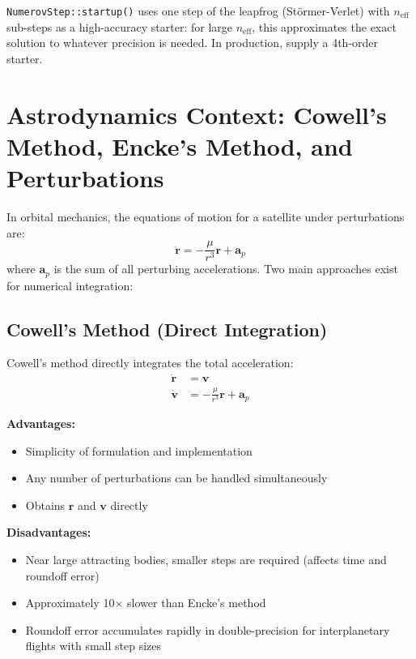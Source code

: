 \documentclass[11pt]{article}
\begin{document}
\texttt{NumerovStep::startup()} uses one step of the leapfrog (Störmer-Verlet)
with $n_\text{eff}$ sub-steps as a high-accuracy starter: for large
$n_\text{eff}$, this approximates the exact solution to whatever precision is
needed.  In production, supply a 4th-order starter.

\section{Astrodynamics Context: Cowell's Method, Encke's Method, and Perturbations}
\label{sec:astrodynamics}

In orbital mechanics, the equations of motion for a satellite under perturbations are:
\begin{equation}
\ddot{\mathbf{r}} = -\frac{\mu}{r^3}\mathbf{r} + \mathbf{a}_p
\end{equation}
where $\mathbf{a}_p$ is the sum of all perturbing accelerations. Two main approaches exist for numerical integration:

\subsection{Cowell's Method (Direct Integration)}
\label{ssec:cowell}

Cowell's method \cite{Bate1971,Curtis2005,Hintz2015} directly integrates the total acceleration:
\begin{align}
\dot{\mathbf{r}} &= \mathbf{v} \\
\dot{\mathbf{v}} &= -\frac{\mu}{r^3}\mathbf{r} + \mathbf{a}_p
\end{align}

\textbf{Advantages:}
\begin{itemize}
\item Simplicity of formulation and implementation
\item Any number of perturbations can be handled simultaneously
\item Obtains $\mathbf{r}$ and $\mathbf{v}$ directly
\end{itemize}

\textbf{Disadvantages:}
\begin{itemize}
\item Near large attracting bodies, smaller steps are required (affects time and roundoff error)
\item Approximately 10$\times$ slower than Encke's method \cite{Bate1971}
\item Roundoff error accumulates rapidly in double-precision for interplanetary flights with small step sizes
\end{itemize}
\end{document}
